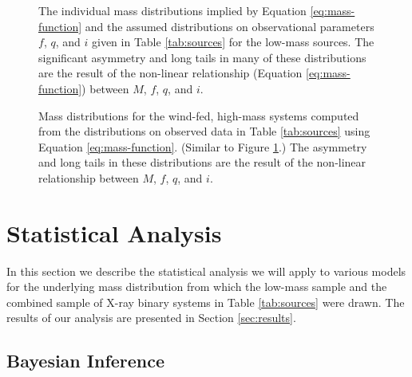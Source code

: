 \documentclass[preprint]{aastex}
\begin{document}
\begin{figure}
  \begin{center}
  \end{center}

  \caption{\label{fig:low-masses} The individual mass distributions
    implied by Equation \eqref{eq:mass-function} and the assumed
    distributions on observational parameters $f$, $q$, and $i$ given
    in Table \ref{tab:sources} for the low-mass sources.  The
    significant asymmetry and long tails in many of these
    distributions are the result of the non-linear relationship
    (Equation \eqref{eq:mass-function}) between $M$, $f$, $q$, and
    $i$.}
\end{figure}

\begin{figure}
  \begin{center}
  \end{center}
  \caption{\label{fig:high-masses} Mass distributions for the
    wind-fed, high-mass systems computed from the distributions on
    observed data in Table \ref{tab:sources} using Equation
    \eqref{eq:mass-function}.  (Similar to Figure
    \ref{fig:low-masses}.)  The asymmetry and long tails in these
    distributions are the result of the non-linear relationship
    between $M$, $f$, $q$, and $i$.}
\end{figure}

\section{Statistical Analysis}
\label{sec:models}

In this section we describe the statistical analysis we will apply to
various models for the underlying mass distribution from which the
low-mass sample and the combined sample of X-ray binary systems in
Table \ref{tab:sources} were drawn.  The results of our analysis are
presented in Section \ref{sec:results}.

\subsection{Bayesian Inference}
\end{document}
